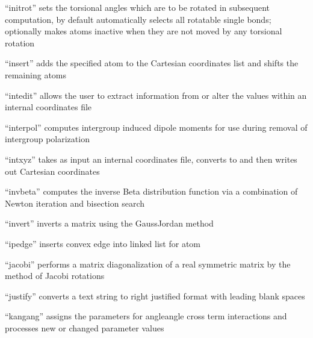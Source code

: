 \documentclass[letterpaper,11pt,english]{sphinxmanual}
\begin{document}

“initrot” sets the torsional angles which are to be rotated
in subsequent computation, by default automatically selects
all rotatable single bonds; optionally makes atoms inactive
when they are not moved by any torsional rotation


“insert” adds the specified atom to the Cartesian
coordinates list and shifts the remaining atoms


“intedit” allows the user to extract information from
or alter the values within an internal coordinates file


“interpol” computes intergroup induced dipole moments for use
during removal of intergroup polarization


“intxyz” takes as input an internal coordinates file,
converts to and then writes out Cartesian coordinates


“invbeta” computes the inverse Beta distribution function
via a combination of Newton iteration and bisection search


“invert” inverts a matrix using the Gauss\sphinxhyphen{}Jordan method


“ipedge” inserts convex edge into linked list for atom


“jacobi” performs a matrix diagonalization of a real
symmetric matrix by the method of Jacobi rotations


“justify” converts a text string to right justified format
with leading blank spaces


“kangang” assigns the parameters for angle\sphinxhyphen{}angle cross term
interactions and processes new or changed parameter values

\end{document}
